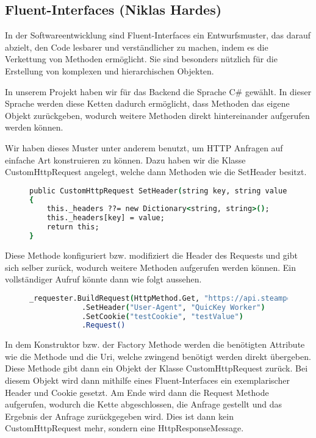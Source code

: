 \subsection*{Fluent-Interfaces (Niklas Hardes)}

In der Softwareentwicklung sind Fluent-Interfaces ein Entwurfsmuster, das darauf abzielt, den Code lesbarer und verständlicher zu machen, indem es die Verkettung von Methoden ermöglicht. Sie sind besonders nützlich für die Erstellung von komplexen und hierarchischen Objekten.

In unserem Projekt haben wir für das Backend die Sprache C\# gewählt. In dieser Sprache werden diese Ketten dadurch ermöglicht, dass Methoden das eigene Objekt zurückgeben, wodurch weitere Methoden direkt hintereinander aufgerufen werden können.

Wir haben dieses Muster unter anderem benutzt, um HTTP Anfragen auf einfache Art konstruieren zu können.
Dazu haben wir die Klasse CustomHttpRequest angelegt, welche dann Methoden wie die SetHeader besitzt.

\begin{figure}[bht]
\begin{lstlisting}[caption=Codeausschnitt von CustomHttpRequest (1),language=csh]
public CustomHttpRequest SetHeader(string key, string value)
{
    this._headers ??= new Dictionary<string, string>();
    this._headers[key] = value;
    return this;
}
\end{lstlisting}
\end{figure}

Diese Methode konfiguriert bzw. modifiziert die Header des Requests und gibt sich selber zurück, wodurch weitere Methoden aufgerufen werden können. Ein vollständiger Aufruf könnte dann wie folgt aussehen.

\begin{figure}[bht]
\begin{lstlisting}[caption=Codeausschnitt von CustomHttpRequest (2),language=csh]
_requester.BuildRequest(HttpMethod.Get, "https://api.steampowered.com/ISteamApps/GetAppList/v2/")
            .SetHeader("User-Agent", "QuicKey Worker")
            .SetCookie("testCookie", "testValue")
            .Request()
\end{lstlisting}
\end{figure}

In dem Konstruktor bzw. der Factory Methode werden die benötigten Attribute wie die Methode und die Uri, welche zwingend benötigt werden direkt übergeben. Diese Methode gibt dann ein Objekt der Klasse CustomHttpRequest zurück. Bei diesem Objekt wird dann mithilfe eines Fluent-Interfaces ein exemplarischer Header und Cookie gesetzt. Am Ende wird dann die Request Methode aufgerufen, wodurch die Kette abgeschlossen, die Anfrage gestellt und das Ergebnis der Anfrage zurückgegeben wird. Dies ist dann kein CustomHttpRequest mehr, sondern eine HttpResponseMessage.


